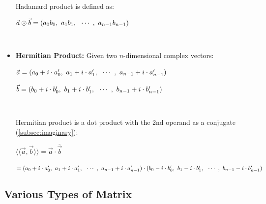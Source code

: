 \begin{tcolorbox}[title={\textbf{\tboxdef{\ref*{subsec:vector-arithmetic}} Vector Arithmetic}}]
\begin{itemize}
$ $

Hadamard product is defined as: 

$\vec{a} \odot \vec{b} = (a_0 b_0, \text{ } a_1 b_1, \text{ } \text{ } \text{$\cdots$} \text{ }, \text{ } a_{n-1} b_{n-1})$

$ $

\item \textbf{Hermitian Product:} Given two $n$-dimensional complex vectors:

$\vec{a} = (a_0 + i \cdot a'_0, \text{ } a_1+ i\cdot a'_1, \text{ } \text{ } \text{$\cdots$} \text{ },\text{ }  a_{n-1}+ i\cdot a'_{n-1})$ 

$\vec{b} = (b_0 + i\cdot b'_0, \text{ } b_1 + i\cdot b'_1, \text{ } \text{ } \text{$\cdots$} \text{ }, \text{ } b_{n-1} + i\cdot b'_{n-1})$

$ $

Hermitian product is a dot product with the 2nd operand as a conjugate (\autoref{subsec:imaginary}): 

$\langle\langle \vec{a}, \vec{b} \rangle\rangle =  \vec{a} \cdot \overline{\vec{b}} $

$ = (a_0 + i \cdot a'_0, \text{ } a_1+ i\cdot a'_1, \text{ } \text{ } \text{$\cdots$} \text{ },\text{ } a_{n-1}+ i\cdot a'_{n-1})  \cdot (b_0 - i\cdot b'_0, \text{ } b_1 - i\cdot b'_1, \text{ } \text{ } \text{$\cdots$} \text{ }, \text{ } b_{n-1} - i\cdot b'_{n-1})$




\end{itemize}
\end{tcolorbox}




\subsection{Various Types of Matrix}
\label{subsec:vandermonde}


